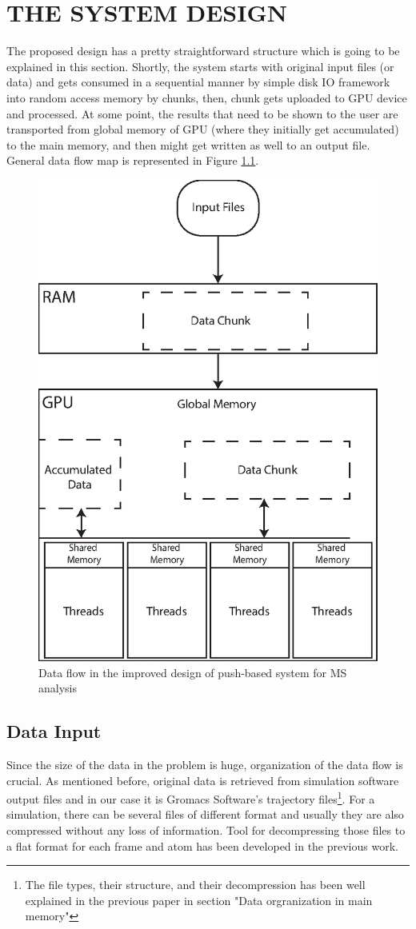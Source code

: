 \documentclass[12pt,letterpaper]{report}
\begin{document}
\chapter{THE SYSTEM DESIGN}\label{sc:system}

\hspace{3em} The proposed design has a pretty straightforward structure which is going to be explained in this section. Shortly, the system starts with original input files (or data) and gets consumed in a sequential manner by simple disk IO framework into random access memory by chunks, then, chunk gets uploaded to GPU device and processed. At some point, the results that need to be shown to the user are transported from global memory of GPU (where they initially get accumulated) to the main memory, and then might get written as well to an output file. General data flow map is represented in Figure  \ref{fg:data-flow}.

\begin{figure}
 \centerline{ \includegraphics[width=0.65\columnwidth]{images/memory-organization.eps} }
 \caption{Data flow in the improved design of push-based system for MS analysis}
 \label{fg:data-flow}
\end{figure}

\section{Data Input}
\hspace{3em} Since the size of the data in the problem is huge, organization of the data flow is crucial. As mentioned before, original data is retrieved from simulation software output files and in our case it is Gromacs Software's trajectory files\footnote{The file types, their structure, and their decompression has been well explained in the previous paper in section "Data orgranization in main memory"}. For a simulation, there can be several files of different format and usually they are also compressed without any loss of information. Tool for decompressing those files to a flat format for each frame and atom has been developed in the previous work\cite{mainPaper}. 
\end{document}
